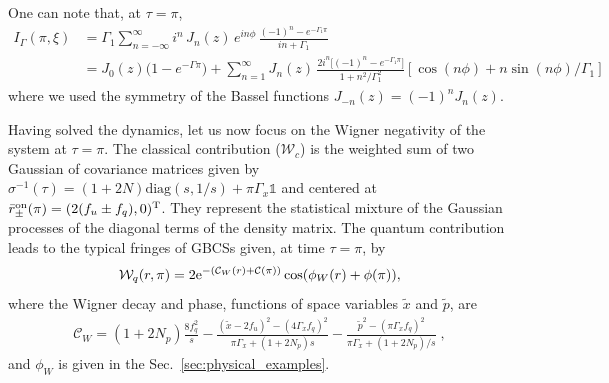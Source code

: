 \documentclass[%
reprint,
superscriptaddress,
nofootinbib,
 amsmath,amssymb,
prx,
floatfix,
]{revtex4-2}
\begin{document}
One can note that, at $\tau = \pi$, 
\begin{align}
     I_\Gamma (\pi, \xi ) &= \Gamma_1 \sum_{n=-\infty}^{\infty} i^n \, J_n(z) \, e^{i n\phi} \,
\frac{(-1)^n - e^{-\Gamma_1\pi}}{i n + \Gamma_1}   \\
& =  J_0(z)\big(1-e^{-\Gamma\pi}\big) 
+ \sum_{n=1}^{\infty} J_n(z)\,\frac{2 i^n  \big[(-1)^n - e^{-\Gamma_1\pi}\big]}{1 + n^2/\Gamma_1^2}
\left[\cos( n\phi ) + n \sin( n\phi ) /\Gamma_1 \right]
\end{align}
where  we used the symmetry of the Bassel functions $J_{-n}(z) = (-1)^{n} J_{n}(z)  $. 

Having solved the dynamics, let us now focus on the Wigner negativity of the system at $\tau = \pi$. The classical contribution ($\mathcal{W}_c$) is the weighted sum of two Gaussian of covariance matrices given by $\sigma^{-1}(\tau) = (1+2N)\text{diag}(s,1/s) + \pi \Gamma_x \mathds{1}$ and centered at $\bar{r}^{\text{on}}_{\pm}(\pi) =  (2(f_u \pm f_q), 0)^{\rm T}$. They represent the statistical mixture of the Gaussian processes of the diagonal terms of the density matrix.
The quantum contribution leads to the typical fringes of GBCSs given, at time $\tau = \pi$, by
\begin{equation}
   \mathcal{W}_q(r, \pi) =  2 {\rm e}^{-(\mathcal{C}_W (r)+ \mathcal{C} (\pi) )} \cos (\phi_W(r) + \phi (\pi)),
\end{equation}
where the Wigner decay and phase, functions of space variables $\tilde{x}$ and $\tilde{p}$, are
\begin{align}
    \mathcal{C}_W =   (1+2N_p) \frac{8 f_q^2}{s} - \frac{\left(\tilde{x}-2 f_u\right)^2 - (4 \Gamma_x f_q)^2}{\pi  \Gamma_x+  (1 +2 N_p)s} 
     - \frac{\tilde{p}^2 - (\pi \Gamma_x f_q)^2 }{\pi  \Gamma_x + (1 + 2 N_p)/s }\;, \nonumber
\end{align}
and $\phi_W $ is given in the Sec.~\ref{sec:physical_examples}.
\end{document}
